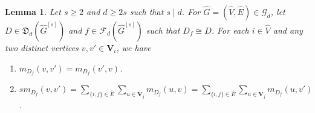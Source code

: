 \documentclass{article}
\newtheorem{lem}[thm]{Lemma}
\begin{document}
\begin{lem}\label{yinli3}
Let $s \geq 2$ and $d \geq 2s$ such that $s \mid d$.
For $\widehat{G} = (\widehat{V},\widehat{E}) \in \mathcal{G}_{d}$,
let $D \in \mathfrak{D}_{d}(\widehat{G}^{[s]})$ and $f \in \mathcal{F}_{d}(\widehat{G}^{[s]})$ such that $D_{f} \cong D$.
For each $i \in \widehat{V}$ and any two distinct vertices $v,v' \in \mathbf{V}_{i}$,
we have
\begin{enumerate}

\item[(a)] $m_{D_f}(v,v')=m_{D_f}(v',v)$.

\item[(b)] $sm_{D_f}(v,v')=\sum_{\{i,j\} \in \widehat{E}}\sum_{u \in \mathbf{V}_{j}}m_{D_f}(u,v)=\sum_{\{i,j\} \in \widehat{E}}\sum_{u \in \mathbf{V}_{j}}m_{D_f}(u,v')$.

\end{enumerate}
\end{lem}
\end{document}
